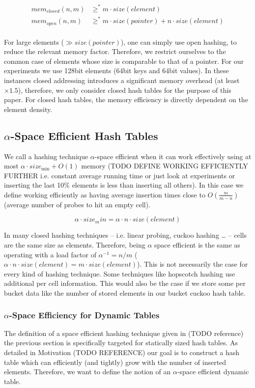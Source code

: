 \documentclass[a4paper,UKenglish]{lipics-v2016}
\begin{document}
\begin{align*}
  mem_{closed}(n,m) &\geq^* m\cdot size(element)\\
  mem_{open}  (n,m) &\geq^* m\cdot size(pointer) + n\cdot size(element)\\
\end{align*}

For large elements (\(\gg size(pointer)\)), one can simply use open
hashing, to reduce the relevant memory factor.  Therefore, we restrict
ourselves to the common case of elements whose size is comparable to
that of a pointer.  For our experiments we use 128bit elements (64bit
keys and 64bit values).  In these instances closed addressing
introduces a significant memory overhead (at least \(\times1.5\)),
therefore, we only consider closed hash tables for the purpose of this
paper. For closed hash tables, the memory efficiency is directly
dependent on the element density.

\subsection{$\alpha$-Space Efficient Hash Tables}
We call a hashing technique \(\alpha\)-space efficient when it can
work effectively using at most $\alpha \cdot size_{\min} + O(1)$
memory (TODO DEFINE WORKING EFFICIENTLY FURTHER i.e. constant average
running time or just look at experiments or inserting the last 10\%
elements is less than inserting all others). In this case we define
working efficiently as having average insertion times close to
$O(\frac{m}{m-n})$ (average number of probes to hit an empty cell).

\[\alpha \cdot size_min = \alpha\cdot n\cdot size(element)\]

In many closed hashing techniques -- i.e. linear probing, cuckoo
hashing \ldots{} -- cells are the same size as elements. Therefore, being
$\alpha$ space efficient is the same as operating with a load factor
of $\alpha^{-1} = n/m$ ($\alpha\cdot n \cdot size(element) = m\cdot
size(element)$).  This is not necessarily the case for every kind of
hashing technique.  Some techniques like hopscotch hashing use
additional per cell information.  This would also be the case if we
store some per bucket data like the number of stored elements in our
bucket cuckoo hash table.

\subsubsection*{$\alpha$-Space Efficiency for Dynamic Tables}
The definition of a space efficient hashing technique given in (TODO
reference) the previous section is specifically targeted for
statically sized hash tables.  As detailed in Motivation (TODO
REFERENCE) our goal is to construct a hash table which can efficiently
(and tightly) grow with the number of inserted elements. Therefore, we
want to define the notion of an \(\alpha\)-space efficient dynamic
table.
\end{document}
